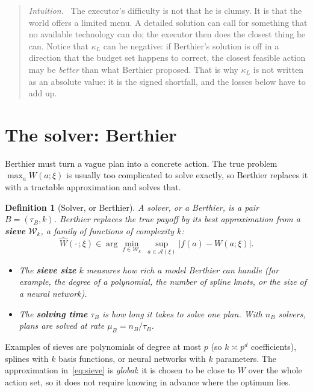 \documentclass[11pt]{article}
\newcommand{\Ber}{\textcolor{ber}{Berthier}}
\newtheorem{definition}{Definition}
\theoremstyle{remark}
\newenvironment{intuition}{\begin{quote}\small\color{muted}\textit{Intuition.}\ }{\end{quote}}
\newcommand{\Acal}{\mathcal{A}}
\begin{document}
\begin{intuition}
The executor's difficulty is not that he is clumsy. It is that the world offers a limited menu. A detailed solution can call for something that no available technology can do; the executor then does the closest thing he can. Notice that $\kappa_L$ can be negative: if \Ber's solution is off in a direction that the budget set happens to correct, the closest feasible action may be \emph{better} than what \Ber{} proposed. That is why $\kappa_L$ is not written as an absolute value: it is the signed shortfall, and the losses below have to add up.
\end{intuition}

\section{\texorpdfstring{The solver: \Ber}{The solver: Berthier}}

\Ber{} must turn a vague plan into a concrete action. The true problem $\max_aW(a;\xi)$ is usually too complicated to solve exactly, so \Ber{} replaces it with a tractable approximation and solves that.

\setcounter{definition}{1}\begin{definition}[Solver, or \Ber]\label{def:berthier}
A solver, or a \Ber, is a pair $B=(\tau_B,k)$. \Ber{} replaces the true payoff by its best approximation from a \textbf{sieve} $\mathcal{W}_k$, a family of functions of complexity $k$:
\begin{equation}\label{eq:sieve}
\hat W(\cdot\,;\xi)\in\arg\min_{f\in\mathcal{W}_k}\ \sup_{a\in\Acal(\xi)}\big|f(a)-W(a;\xi)\big|.
\end{equation}
\begin{itemize}
  \item The \textbf{sieve size} $k$ measures how rich a model \Ber{} can handle (for example, the degree of a polynomial, the number of spline knots, or the size of a neural network).
  \item The \textbf{solving time} $\tau_B$ is how long it takes to solve one plan. With $n_B$ solvers, plans are solved at rate $\mu_B=n_B/\tau_B$.
\end{itemize}
\end{definition}

Examples of sieves are polynomials of degree at most $p$ (so $k\asymp p^d$ coefficients), splines with $k$ basis functions, or neural networks with $k$ parameters. The approximation in~\eqref{eq:sieve} is \emph{global}: it is chosen to be close to $W$ over the whole action set, so it does not require knowing in advance where the optimum lies.
\end{document}
